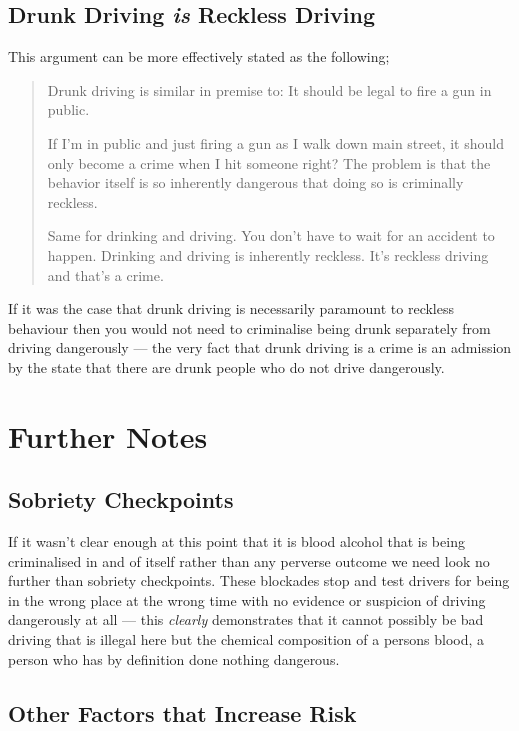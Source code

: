 \documentclass[11pt]{article}
\begin{document}
\subsection{Drunk Driving \emph{is} Reckless Driving}
\label{sec:orgc3135fd}

This argument can be more effectively stated as the following;

\begin{quote}
Drunk driving is similar in premise to: It should be legal to fire a gun in public.

If I'm in public and just firing a gun as I walk down main street, it should only become a crime when I hit someone right? The problem is that the behavior itself is so inherently dangerous that doing so is criminally reckless.

Same for drinking and driving. You don't have to wait for an accident to happen. Drinking and driving is inherently reckless. It's reckless driving and that's a crime.
\end{quote}

If it was the case that drunk driving is necessarily paramount to reckless behaviour then you would not need to criminalise being drunk separately from driving dangerously --- the very fact that drunk driving is a crime is an admission by the state that there are drunk people who do not drive dangerously.


\section{Further Notes}
\label{sec:orga953cf3}

\subsection{Sobriety Checkpoints}
\label{sec:org30e9a16}

If it wasn't clear enough at this point that it is blood alcohol that is being criminalised in and of itself rather than any perverse outcome we need look no further than sobriety checkpoints. These blockades stop and test drivers for being in the wrong place at the wrong time with no evidence or suspicion of driving dangerously at all --- this \emph{clearly} demonstrates that it cannot possibly be bad driving that is illegal here but the chemical composition of a persons blood, a person who has by definition done nothing dangerous.


\subsection{Other Factors that Increase Risk}
\label{sec:org685952c}
\end{document}

